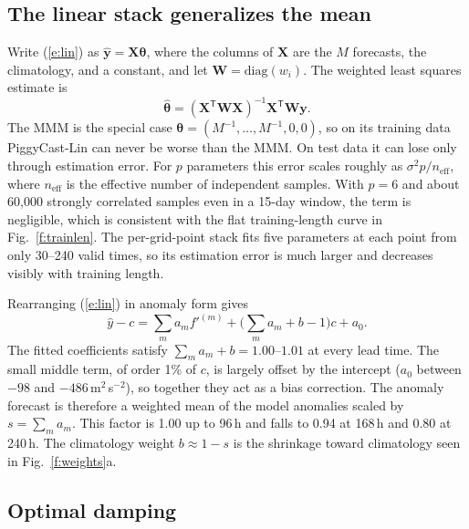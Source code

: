 \documentclass[twocol]{ametsocV6.1}
\newcommand{\units}{m$^{2}$\,s$^{-2}$}
\newcommand{\PCLin}{PiggyCast-Lin}
\begin{document}
\subsection{The linear stack generalizes the mean}

Write (\ref{e:lin}) as $\hat{\mathbf y}=\mathbf X\boldsymbol\theta$, where the columns of $\mathbf X$ are the $M$ forecasts, the climatology, and a constant, and let $\mathbf W=\mathrm{diag}(w_i)$. The weighted least squares estimate is
\begin{equation}
\hat{\boldsymbol\theta}=(\mathbf X^{\mathsf T}\mathbf W\mathbf X)^{-1}\mathbf X^{\mathsf T}\mathbf W\mathbf y. \label{e:wls}
\end{equation}
The MMM is the special case $\boldsymbol\theta=(M^{-1},\dots,M^{-1},0,0)$, so on its training data \PCLin{} can never be worse than the MMM. On test data it can lose only through estimation error. For $p$ parameters this error scales roughly as $\sigma^2 p/n_{\mathrm{eff}}$, where $n_{\mathrm{eff}}$ is the effective number of independent samples. With $p=6$ and about 60{,}000 strongly correlated samples even in a 15-day window, the term is negligible, which is consistent with the flat training-length curve in Fig.~\ref{f:trainlen}. The per-grid-point stack fits five parameters at each point from only 30--240 valid times, so its estimation error is much larger and decreases visibly with training length.

Rearranging (\ref{e:lin}) in anomaly form gives
\begin{equation}
\hat y-c=\sum_m a_m f'^{(m)}+\Big(\sum_m a_m+b-1\Big)c+a_0. \label{e:linanom}
\end{equation}
The fitted coefficients satisfy $\sum_m a_m+b=1.00$--$1.01$ at every lead time. The small middle term, of order 1\% of $c$, is largely offset by the intercept ($a_0$ between $-98$ and $-486$\,\units), so together they act as a bias correction. The anomaly forecast is therefore a weighted mean of the model anomalies scaled by $s=\sum_m a_m$. This factor is 1.00 up to 96\,h and falls to 0.94 at 168\,h and 0.80 at 240\,h. The climatology weight $b\approx1-s$ is the shrinkage toward climatology seen in Fig.~\ref{f:weights}a.

\subsection{Optimal damping}
\end{document}
